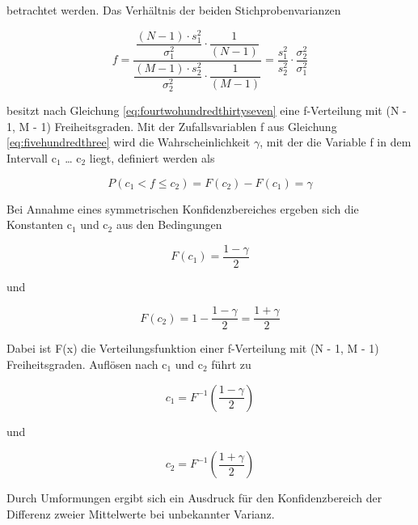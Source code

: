 \noindent betrachtet werden. Das Verh\"{a}ltnis der beiden Stichprobenvarianzen

\begin{equation}\label{eq:fivehundredthree}
f=\dfrac{\dfrac{\left(N-1\right)\cdot s_{1}^{2} }{\sigma _{1}^{2} } \cdot \dfrac{1}{\left(N-1\right)} }{\dfrac{\left(M-1\right)\cdot s_{2}^{2} }{\sigma _{2}^{2} } \cdot \dfrac{1}{\left(M-1\right)} } =\dfrac{s_{1}^{2} }{s_{2}^{2} } \cdot \dfrac{\sigma _{2}^{2} }{\sigma _{1}^{2} }
\end{equation}

\noindent besitzt nach Gleichung \eqref{eq:fourtwohundredthirtyseven} eine f-Verteilung mit (N - 1, M - 1) Freiheitsgraden. Mit der Zufallsvariablen f aus Gleichung \eqref{eq:fivehundredthree} wird die Wahrscheinlichkeit $\gamma$, mit der die Variable f in dem Intervall c${}_{1}$ {\dots} c${}_{2}$ liegt, definiert werden als

\begin{equation}\label{eq:fivehundredfour}
P\left(c_{1} <f\le c_{2} \right)=F(c_{2})-F(c_{1})=\gamma
\end{equation}

\noindent Bei Annahme eines symmetrischen Konfidenzbereiches ergeben sich die Konstanten c${}_{1}$ und c${}_{2}$ aus den Bedingungen

\begin{equation}\label{eq:fivehundredfive}
F(c_{1})=\dfrac{1-\gamma }{2}
\end{equation}

\noindent und 

\begin{equation}\label{eq:fivehundredsix}
F(c_{2})=1-\dfrac{1-\gamma}{2} =\dfrac{1+\gamma }{2}
\end{equation}

\noindent Dabei ist F(x) die Verteilungsfunktion einer f-Verteilung mit (N - 1, M - 1) Freiheitsgraden. Aufl\"{o}sen nach c${}_{1}$ und c${}_{2}$ f\"{u}hrt zu

\begin{equation}\label{eq:fivehundredseven}
c_{1} =F^{-1} \left(\dfrac{1-\gamma }{2} \right)
\end{equation}

\noindent und

\begin{equation}\label{eq:fivehundredeight}
c_{2} =F^{-1} \left(\dfrac{1+\gamma }{2} \right)
\end{equation}

\noindent Durch Umformungen ergibt sich ein Ausdruck f\"{u}r den Konfidenzbereich der Differenz zweier Mittelwerte bei unbekannter Varianz.

